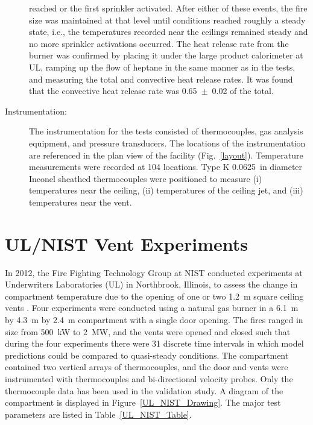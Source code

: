 \begin{description}
reached or the first sprinkler activated. After either of these events, the fire size was maintained at that level until conditions reached roughly a
steady state, i.e., the temperatures recorded near the ceilings remained steady and no more sprinkler activations occurred.
The heat release rate from the burner was confirmed by placing it under the large product calorimeter at UL, ramping up the flow of heptane in the
same manner as in the tests, and measuring the total and convective heat release rates. It was found that the convective heat release rate was
0.65~$\pm$~0.02 of the total.
\item[Instrumentation:] The instrumentation for the tests consisted of thermocouples, gas analysis equipment, and pressure transducers. The locations of the instrumentation
are referenced in the plan view of the facility (Fig.~\ref{layout}).
Temperature measurements were recorded at 104 locations. Type K 0.0625~in diameter Inconel sheathed thermocouples were positioned to measure (i)
temperatures near the ceiling, (ii) temperatures of the ceiling jet, and (iii) temperatures near the vent.
\end{description}

\section{UL/NIST Vent Experiments}
\label{UL_NIST_Vents_Description}

In 2012, the Fire Fighting Technology Group at NIST conducted experiments at Underwriters Laboratories (UL) in Northbrook, Illinois, to assess the change in compartment temperature due to the opening of one or two 1.2~m square ceiling vents \cite{Opert:2012}. Four experiments were conducted using a natural gas burner in a 6.1~m by 4.3~m by 2.4~m compartment with a single door opening. The fires ranged in size from 500~kW to 2~MW, and the vents were opened and closed such that during the four experiments there were 31 discrete time intervals in which model predictions could be compared to quasi-steady conditions. The compartment contained two vertical arrays of thermocouples, and the door and vents were instrumented with thermocouples and bi-directional velocity probes. Only the thermocouple data has been used in the validation study. A diagram of the compartment is displayed in Figure~\ref{UL_NIST_Drawing}. The major test parameters are listed in Table~\ref{UL_NIST_Table}.

